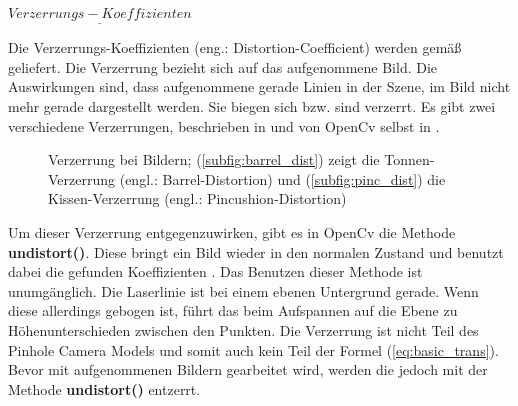 		$\underline{Verzerrungs-Koeffizienten}$
		
		Die Verzerrungs-Koeffizienten (eng.: Distortion-Coefficient) werden gemäß \citep[vgl.][]{noauthor_opencv_nodate-1} geliefert. Die Verzerrung bezieht sich auf das aufgenommene Bild. Die Auswirkungen sind, dass aufgenommene gerade Linien in der Szene, im Bild nicht mehr gerade dargestellt werden. Sie biegen sich bzw. sind verzerrt. Es gibt zwei verschiedene Verzerrungen, beschrieben in \citep[vgl.][S. 41]{measurement_1995} und von OpenCv selbst in \citep[vgl.][]{noauthor_opencv_nodate-2}.
		
		\begin{figure}[h]
			\centering
			\caption[Verzerrung bei Bildern]{Verzerrung bei Bildern; (\ref{subfig:barrel_dist}) zeigt die Tonnen-Verzerrung (engl.: Barrel-Distortion) und (\ref{subfig:pinc_dist}) die Kissen-Verzerrung (engl.: Pincushion-Distortion)}
			\label{fig:distortion}
		\end{figure}
	
		Um dieser Verzerrung entgegenzuwirken, gibt es in OpenCv die Methode \textbf{undistort()}. Diese bringt ein Bild wieder in den normalen Zustand und benutzt dabei die gefunden Koeffizienten \citep[vgl.][]{noauthor_opencv_nodate-1}. Das Benutzen dieser Methode ist unumgänglich. Die Laserlinie ist bei einem ebenen Untergrund gerade. Wenn diese allerdings gebogen ist, führt das beim Aufspannen auf die Ebene zu Höhenunterschieden zwischen den Punkten. Die Verzerrung ist nicht Teil des Pinhole Camera Models und somit auch kein Teil der Formel (\ref{eq:basic_trans}). Bevor mit aufgenommenen Bildern gearbeitet wird, werden die jedoch mit der Methode \textbf{undistort()} entzerrt.
		
